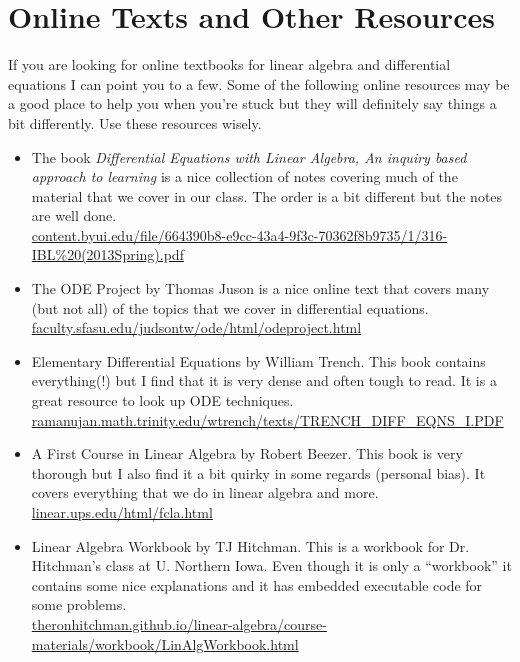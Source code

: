\section{Online Texts and Other Resources}\label{pref:resources}
If you are looking for online textbooks for linear algebra and differential equations I
can point you to a few.  Some of the following online resources may be a good place to
help you when you're stuck but
they will definitely say things a bit differently. Use these resources wisely.
\begin{itemize}
    \item The book {\it Differential Equations with Linear Algebra, An inquiry based approach
        to learning} is a nice collection of notes covering much of the material that we
        cover in our class.  The order is a bit different but the notes are well done.
        \\\href{https://content.byui.edu/file/664390b8-e9cc-43a4-9f3c-70362f8b9735/1/316-IBL\%20(2013Spring).pdf}{content.byui.edu/file/664390b8-e9cc-43a4-9f3c-70362f8b9735/1/316-IBL\%20(2013Spring).pdf}
    \item The ODE Project by Thomas Juson is a nice online text that covers many (but
        not all) of the topics that we cover in differential equations. \\
        \href{http://faculty.sfasu.edu/judsontw/ode/html/odeproject.html}{faculty.sfasu.edu/judsontw/ode/html/odeproject.html}
    \item Elementary Differential Equations by William Trench.  This book contains
        everything(!) but I find  that it is very dense and often tough to read.  It is a
        great resource to look up ODE techniques.  \\
        \href{http://ramanujan.math.trinity.edu/wtrench/texts/TRENCH_DIFF_EQNS_I.PDF}{ramanujan.math.trinity.edu/wtrench/texts/TRENCH\_DIFF\_EQNS\_I.PDF}
    \item A First Course in Linear Algebra by Robert Beezer. This book is very thorough
        but I also find it a bit quirky in some regards (personal bias). It covers
        everything that we do in linear algebra and more. \\
        \href{http://linear.ups.edu/html/fcla.html}{linear.ups.edu/html/fcla.html}
    \item Linear Algebra Workbook by TJ Hitchman. This is a workbook for Dr. Hitchman's
        class at U. Northern Iowa.  Even though it is only a ``workbook'' it contains some nice explanations and it has
        embedded executable code for some problems. \\
        \href{http://theronhitchman.github.io/linear-algebra/course-materials/workbook/LinAlgWorkbook.html}{theronhitchman.github.io/linear-algebra/course-materials/workbook/LinAlgWorkbook.html}
\end{itemize}

